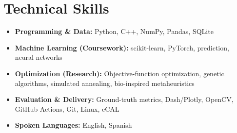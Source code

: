 \section{Technical Skills}
\begin{itemize}[leftmargin=0.15in, label={}, itemsep=0pt, parsep=0pt]
    \small
    \item \textbf{Programming \& Data:} Python, C++, NumPy, Pandas, SQLite
    \item \textbf{Machine Learning (Coursework):} scikit-learn, PyTorch, prediction, neural networks
    \item \textbf{Optimization (Research):} Objective-function optimization, genetic algorithms, simulated annealing, bio-inspired metaheuristics
    \item \textbf{Evaluation \& Delivery:} Ground-truth metrics, Dash/Plotly, OpenCV, GitHub Actions, Git, Linux, eCAL
    \item \textbf{Spoken Languages:} English, Spanish
\end{itemize}